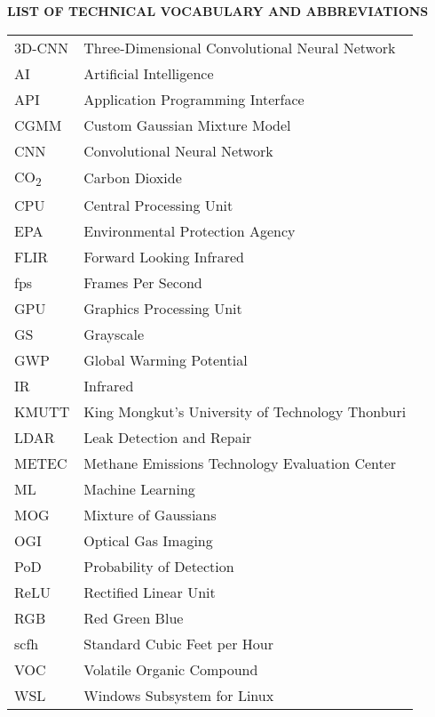 \newpage
\thispagestyle{empty}

\begin{center}
\fontsize{12}{18}\bfseries\selectfont
LIST OF TECHNICAL VOCABULARY AND ABBREVIATIONS
\end{center}

\vspace{6pt}

\fontsize{12}{18}\selectfont
\begin{longtable}{@{}p{3cm}p{11cm}@{}}
3D-CNN & Three-Dimensional Convolutional Neural Network \\[3pt]
AI & Artificial Intelligence \\[3pt]
API & Application Programming Interface \\[3pt]
CGMM & Custom Gaussian Mixture Model \\[3pt]
CNN & Convolutional Neural Network \\[3pt]
CO\textsubscript{2} & Carbon Dioxide \\[3pt]
CPU & Central Processing Unit \\[3pt]
EPA & Environmental Protection Agency \\[3pt]
FLIR & Forward Looking Infrared \\[3pt]
fps & Frames Per Second \\[3pt]
GPU & Graphics Processing Unit \\[3pt]
GS & Grayscale \\[3pt]
GWP & Global Warming Potential \\[3pt]
IR & Infrared \\[3pt]
KMUTT & King Mongkut's University of Technology Thonburi \\[3pt]
LDAR & Leak Detection and Repair \\[3pt]
METEC & Methane Emissions Technology Evaluation Center \\[3pt]
ML & Machine Learning \\[3pt]
MOG & Mixture of Gaussians \\[3pt]
OGI & Optical Gas Imaging \\[3pt]
PoD & Probability of Detection \\[3pt]
ReLU & Rectified Linear Unit \\[3pt]
RGB & Red Green Blue \\[3pt]
scfh & Standard Cubic Feet per Hour \\[3pt]
VOC & Volatile Organic Compound \\[3pt]
WSL & Windows Subsystem for Linux \\[3pt]
\end{longtable}